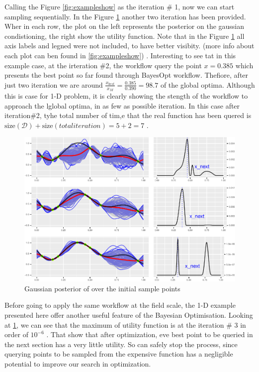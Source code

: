 \documentclass[]{elsarticle} %
\begin{document}
\begin{eqution}
Calling the Figure \ref{fig:exampleshow} as the iteration \# 1, now we can start sampling sequentially. In the Figure \ref{fig:allinone} another two iteration has been provided. Wher in each row, the plot on the left represents the posterior on the gaussian condistioning, the right show the utility function. Note that in the Figure \ref{fig:allinone} all axis labels and legned were not included, to have better visibity. (more info about each plot can ben found in \ref{fig:exampleshow}) . Interesting to see tat in this example case, at the irteration \#2, the workflow query the point \(x=0.385\) which presents the best point so far found through BayesOpt workflow. Thefiore, after just two iteration we are around \(\frac{x_{best}}{x_{M}}=\frac{0.385}{0.390}=98.7%
\) of the global optima. Although this is case for 1-D problem, it is clearly showing the stength of the workflow to approach the lglobal optima, in as few as possible iteration. In this case after iteration\#2, tyhe total number of tim,e that the real function has been quered is \(\text{size}(\mathcal{D}) + \text{size}(total iteration) = 5 + 2=7\) .

\begin{figure}

\includegraphics[width=0.9\linewidth,height=0.9\textheight]{0_Paper1_main_files/figure-latex/allinone-1} \hfill{}

\caption{Gaussian posterior of over the initial sample points}\label{fig:allinone}
\end{figure}

Before going to apply the same workflow at the field scale, the 1-D example presented here offer another useful feature of the Bayesian Optimisation. Looking at \ref{fig:allinone}, we can see that the maximum of utility function is at the iteration \# 3 in order of \(10^{-6}\) . That show that after optimization, eve best point to be queried in the next section has a very little utility. So can safely stop the process, since querying points to be sampled from the expensive function has a negligible potential to improve our search in optimization.


\end{eqution}
\end{document}
